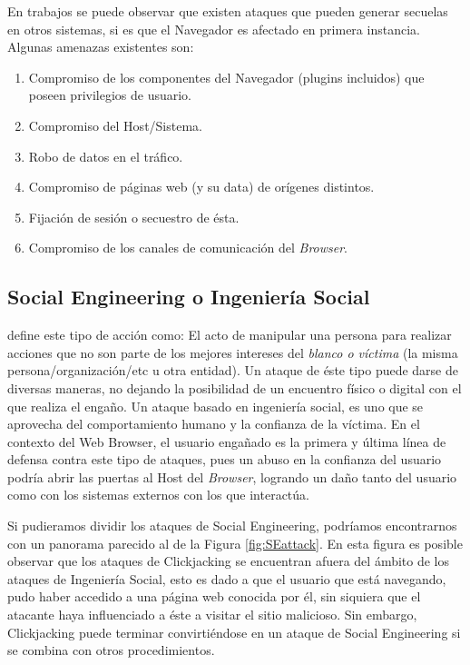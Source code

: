En trabajos \cite{barth2008security, FirefoxThreatModel} se puede observar que existen ataques que pueden generar secuelas en otros sistemas, si es que el Navegador es afectado en primera instancia. Algunas amenazas existentes son:

\begin{enumerate}
	\item Compromiso de los componentes del Navegador (plugins incluidos) que poseen privilegios de usuario.
	\item Compromiso del Host/Sistema.
	\item Robo de datos en el tráfico.
	\item Compromiso de páginas web (y su data) de orígenes distintos.
	\item Fijación de sesión o secuestro de ésta.
	\item Compromiso de los canales de comunicación del \textit{Browser}.
\end{enumerate}

\subsection{Social Engineering o Ingeniería Social}
\cite{socEngineeering} define este tipo de acción como: El acto de manipular una persona para realizar acciones que no son parte de los mejores intereses del \textit{blanco o víctima} (la misma persona/organización/etc u otra entidad). Un ataque de éste tipo puede darse de diversas maneras, no dejando la posibilidad de un encuentro físico o digital con el que realiza el engaño. Un ataque basado en ingeniería social, es uno que se aprovecha del comportamiento humano y la confianza de la víctima. En el contexto del Web Browser, el usuario engañado es la primera y última línea de defensa contra este tipo de ataques, pues un abuso en la confianza del usuario podría abrir las puertas al Host del \textit{Browser}, logrando un daño tanto del usuario como con los sistemas externos con los que interactúa.

Si pudieramos dividir los ataques de Social Engineering, podríamos encontrarnos con un panorama parecido al de la Figura \ref{fig:SEattack}. En esta figura es posible observar que los ataques de Clickjacking se encuentran afuera del ámbito de los ataques de  Ingeniería Social, esto es dado a que el usuario que está navegando, pudo haber accedido a una página web conocida por él, sin siquiera que el atacante haya influenciado a éste a visitar el sitio malicioso. Sin embargo, Clickjacking puede terminar convirtiéndose en un ataque de Social Engineering si se combina con otros procedimientos.

